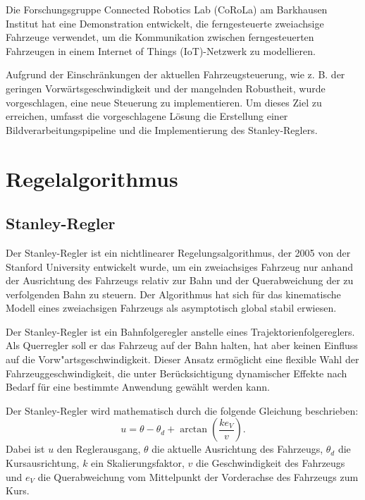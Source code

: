 \documentclass[arbeit=studie,oneside,BCOR=12mm]{ArbeitRST}
\begin{document}
Die Forschungsgruppe Connected Robotics Lab (CoRoLa) am Barkhausen Institut hat
eine Demonstration entwickelt, die ferngesteuerte zweiachsige Fahrzeuge
verwendet, um die Kommunikation zwischen ferngesteuerten Fahrzeugen in einem
Internet of Things (IoT)-Netzwerk zu modellieren.

Aufgrund der Einschränkungen der aktuellen Fahrzeugsteuerung, wie z. B. der
geringen Vorwärtsgeschwindigkeit und der mangelnden Robustheit, wurde
vorgeschlagen, eine neue Steuerung zu implementieren. Um dieses Ziel zu
erreichen, umfasst die vorgeschlagene Lösung die Erstellung einer
Bildverarbeitungspipeline und die Implementierung des Stanley-Reglers.

\chapter{Regelalgorithmus}

\section{Stanley-Regler}

Der Stanley-Regler ist ein nichtlinearer Regelungsalgorithmus, der 2005 von
der Stanford University entwickelt wurde, um ein zweiachsiges Fahrzeug nur
anhand der Ausrichtung des Fahrzeugs relativ zur Bahn und der Querabweichung der zu verfolgenden Bahn zu
steuern. Der Algorithmus hat sich für das kinematische Modell eines
zweiachsigen Fahrzeugs als asymptotisch global stabil erwiesen.

Der Stanley-Regler ist ein Bahnfolgeregler anstelle eines
Trajektorienfolgereglers. Als Querregler soll er das Fahrzeug auf der Bahn
halten, hat aber keinen Einfluss auf die Vorw"artsgeschwindigkeit. Dieser
Ansatz ermöglicht eine flexible Wahl der Fahrzeuggeschwindigkeit, die unter
Berücksichtigung dynamischer Effekte nach Bedarf für eine bestimmte Anwendung
gewählt werden kann. 

Der Stanley-Regler wird mathematisch durch die folgende Gleichung beschrieben:
\begin{equation} 
  u = \theta - \theta_d + \arctan\left(\frac{ke_{V}}{v}\right).
  \label{eq:Stanley-Regler} 
\end{equation}
Dabei ist $u$ den Reglerausgang, $\theta$ die aktuelle Ausrichtung des Fahrzeugs,
$\theta_d$ die Kursausrichtung, $k$ ein Skalierungsfaktor, $v$ die
Geschwindigkeit des Fahrzeugs und $e_{V}$ die Querabweichung vom Mittelpunkt
der Vorderachse des Fahrzeugs zum Kurs.
\end{document}
